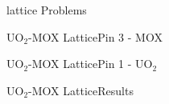 \documentclass[sans,mathserif,aspectratio=169]{beamer}
\begin{document}
\begin{frame}{lattice Problems}
  \centering
\end{frame}

\begin{frame}{UO$_2$-MOX Lattice}{Pin 3 - MOX}
  \centering
\end{frame}

\begin{frame}{UO$_2$-MOX Lattice}{Pin 1 - UO$_2$}
  \centering
\end{frame}

\begin{frame}{UO$_2$-MOX Lattice}{Results}
  \centering
\end{frame}
\end{document}
